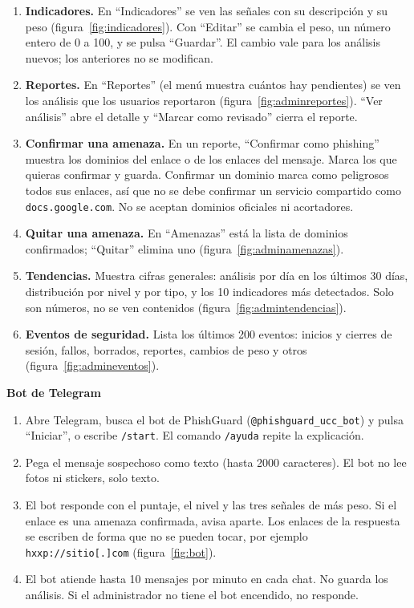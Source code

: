 \documentclass[journal,onecolumn,12pt,draftclsnofoot]{IEEEtran}
\newcommand{\apartado}[1]{\par\medskip\noindent\textbf{#1}\par\smallskip}
\begin{document}
\begin{enumerate}
  \item \textbf{Indicadores.} En ``Indicadores'' se ven las señales con su descripción y su peso (figura~\ref{fig:indicadores}). Con ``Editar'' se cambia el peso, un número entero de 0 a 100, y se pulsa ``Guardar''. El cambio vale para los análisis nuevos; los anteriores no se modifican.
  \item \textbf{Reportes.} En ``Reportes'' (el menú muestra cuántos hay pendientes) se ven los análisis que los usuarios reportaron (figura~\ref{fig:adminreportes}). ``Ver análisis'' abre el detalle y ``Marcar como revisado'' cierra el reporte.
  \item \textbf{Confirmar una amenaza.} En un reporte, ``Confirmar como phishing'' muestra los dominios del enlace o de los enlaces del mensaje. Marca los que quieras confirmar y guarda. Confirmar un dominio marca como peligrosos todos sus enlaces, así que no se debe confirmar un servicio compartido como \texttt{docs.google.com}. No se aceptan dominios oficiales ni acortadores.
  \item \textbf{Quitar una amenaza.} En ``Amenazas'' está la lista de dominios confirmados; ``Quitar'' elimina uno (figura~\ref{fig:adminamenazas}).
  \item \textbf{Tendencias.} Muestra cifras generales: análisis por día en los últimos 30 días, distribución por nivel y por tipo, y los 10 indicadores más detectados. Solo son números, no se ven contenidos (figura~\ref{fig:admintendencias}).
  \item \textbf{Eventos de seguridad.} Lista los últimos 200 eventos: inicios y cierres de sesión, fallos, borrados, reportes, cambios de peso y otros (figura~\ref{fig:admineventos}).
\end{enumerate}

\apartado{Bot de Telegram}

\begin{enumerate}
  \item Abre Telegram, busca el bot de PhishGuard (\texttt{@phishguard\_ucc\_bot}) y pulsa ``Iniciar'', o escribe \texttt{/start}. El comando \texttt{/ayuda} repite la explicación.
  \item Pega el mensaje sospechoso como texto (hasta 2000 caracteres). El bot no lee fotos ni stickers, solo texto.
  \item El bot responde con el puntaje, el nivel y las tres señales de más peso. Si el enlace es una amenaza confirmada, avisa aparte. Los enlaces de la respuesta se escriben de forma que no se pueden tocar, por ejemplo \texttt{hxxp://sitio[.]com} (figura~\ref{fig:bot}).
  \item El bot atiende hasta 10 mensajes por minuto en cada chat. No guarda los análisis. Si el administrador no tiene el bot encendido, no responde.
\end{enumerate}
\end{document}
